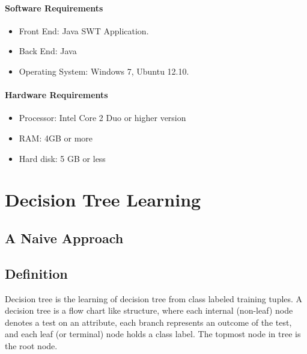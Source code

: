 \documentclass[12pt]{report}
\begin{document}
\subsubsection{Software Requirements}
\begin{itemize}

\item{	Front End: Java SWT Application.}
\item{	Back End: Java}
\item{	Operating System: Windows 7, Ubuntu 12.10.}

\end{itemize}

\subsubsection{Hardware Requirements}
\begin{itemize}
\item{Processor: Intel Core 2 Duo or higher version}
\item{RAM: 4GB or more}
\item{Hard disk: 5 GB or less}
\end{itemize}

%
\pagestyle{fancy}
\chead{}
\rfoot{\small{\thepage}}
\renewcommand{\headrulewidth}{0.4pt}
\renewcommand{\footrulewidth}{0.4pt}
\chapter{Decision Tree Learning}



\section{A Naive Approach}



\section{Definition}


Decision tree is the learning of decision tree from class labeled training tuples. A decision tree is a flow chart like structure, where each internal (non-leaf) node denotes a test on an attribute, each branch represents an outcome of the test, and each leaf (or terminal) node holds a class label. The topmost node in tree is the root node.
\end{document}
